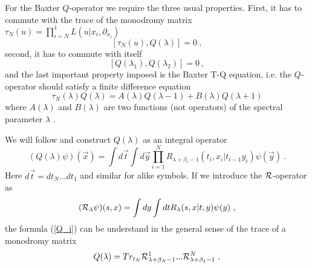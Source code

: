 \documentclass[a4paper,11pt]{article}
\begin{document}
For the Baxter $Q$-operator we require the three usual properties. First, it
has to commute with the trace of the monodromy matrix $\tau_N(u) =
\prod_{i=N}^1 L(u|x_i,\partial_{x_i}) $
\begin{equation}
\label{tauQ}
[\tau_N(u),Q(\lambda )]=0 ~,
\end{equation}
second, it has to commute with itself
\begin{equation}
\label{QQ}
[Q(\lambda_1),Q(\lambda_2)]=0 ~,
\end{equation}
and the last important property imposed is the Baxter T-Q equation, i.e. the
$Q$-operator should satisfy a finite difference equation
\begin{equation}
\label{TQ}
\tau_N(\lambda )Q(\lambda )=A(\lambda)Q(\lambda -1)+B(\lambda)Q(\lambda +1)
\end{equation}
where $A(\lambda )$ and $B(\lambda )$ are two functions (not operators) of
the spectral parameter $\lambda$ .

We will follow \cite {Sky} and construct $Q(\lambda)$ as an integral
operator
\begin{equation}
\label{Q_i}
(Q(\lambda )\psi)({\vec x})
       =\int d{\vec t}\int d{\vec y}
       \prod _{i=1}^N R_{\lambda +\beta_i-1}(t_i,x_i|t_{i-1}y_i)\psi({\vec y}) ~.
\end{equation}
Here $d{\vec t}=dt_N...dt_1$ and similar for alike symbols. If we introduce
the ${\cal R}$-operator as
\begin{equation}
\label{intR}
({\cal R}_\lambda \psi )(s,x)=\int dy \int dt R_{\lambda}(s,x|t,y)\psi (y) ~,
\end{equation}
the formula (\ref{Q_i}) can be understand in the general sense of the trace
of a monodromy matrix
\begin{equation}
\label{Qtr}
Q(\lambda)=Tr_{t_N}{\cal R}_{\lambda +\beta_N-1}^1...{\cal R}_{\lambda +\beta_1-1}^N ~.
\end{equation}
\end{document}
